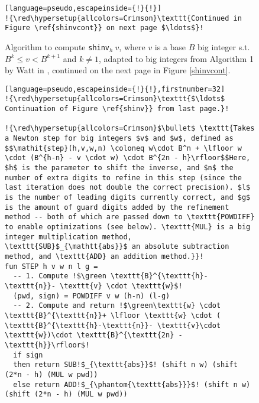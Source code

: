 \begin{figure}
\begin{lstlisting}[language=pseudo,escapeinside={!}{!}]
!{\red\hypersetup{allcolors=Crimson}\texttt{Continued in Figure \ref{shinvcont}} on next page $\ldots$}!
\end{lstlisting}
  \caption{\footnotesize Algorithm to compute \texttt{shinv}$_h~v$, where $v$ is a base $B$ big integer s.t.\ $B^k \leq v < B^{k+1}$ and $k\neq 1$, adapted to big integers from Algorithm 1 by Watt in \cite{watt2023efficient}, continued on the next page in Figure \ref{shinvcont}.}
  \label{shinv}
\end{figure}
\begin{figure}
\begin{lstlisting}[language=pseudo,escapeinside={!}{!},firstnumber=32]
!{\red\hypersetup{allcolors=Crimson}\texttt{$\ldots$ Continuation of Figure \ref{shinv}} from last page.}!

!{\red\hypersetup{allcolors=Crimson}$\bullet$ \texttt{Takes a Newton step for big integers $v$ and $w$, defined as $$\mathit{step}(h,v,w,n) \coloneq w\cdot B^n + \lfloor w \cdot (B^{h-n} - v \cdot w) \cdot B^{2n - h}\rfloor$$Here, $h$ is the parameter to shift the inverse, and $n$ the number of extra digits to refine in this step (since the last iteration does not double the correct precision). $l$ is the number of leading digits currently correct, and $g$ is the amount of guard digits added by the refinement method -- both of which are passed down to \texttt{POWDIFF} to enable optimizations (see below). \texttt{MUL} is a big integer multiplication method, \texttt{SUB}$_{\mathtt{abs}}$ an absolute subtraction method, and \texttt{ADD} an addition method.}}!
fun STEP h v w n l g =
  -- 1. Compute !$\green \texttt{B}^{\texttt{h}- \texttt{n}}- \texttt{v} \cdot \texttt{w}$!
  (pwd, sign) = POWDIFF v w (h-n) (l-g)
  -- 2. Compute and return !$\green\texttt{w} \cdot \texttt{B}^{\texttt{n}}+ \lfloor \texttt{w} \cdot ( \texttt{B}^{\texttt{h}-\texttt{n}}- \texttt{v}\cdot \texttt{w})\cdot \texttt{B}^{\texttt{2n} - \texttt{h}}\rfloor$!
  if sign
  then return SUB!$_{\texttt{abs}}$! (shift n w) (shift (2*n - h) (MUL w pwd))
  else return ADD!$_{\phantom{\texttt{abs}}}$! (shift n w) (shift (2*n - h) (MUL w pwd))


\end{lstlisting}
\end{figure}
